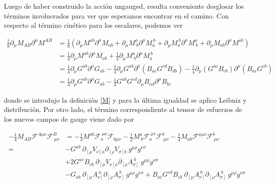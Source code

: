 \documentclass{article}
\numberwithin{equation}{section}
\begin{document}
Luego de haber construido la acción ungauged, resulta conveniente desglosar los términos involucrados para ver que esperamos encontrar en el camino. Con respecto al término cinético para los escalares, podemos ver


\begin{equation} \label{DMDM}
\begin{aligned}
\frac{1}{8}\partial_{\mu} M_{A B} \partial^{\mu} M^{A B} &= \frac{1}{8} \left( \partial_{\mu} M^{a b} \partial^{\mu} M_{a b}  + \partial_{\mu} M^a_{\ b} \partial^{\mu} M_a^{\ b} + \partial_{\mu} M_a^{\ b} \partial^{\mu} M^a_{\ b} + \partial_{\mu} M_{a b} \partial^{\mu} M^{a b} \right)\\
&= \frac{1}{4} \partial_{\mu} M^{a b} \partial^{\mu} M_{a b} + \frac{1}{4} \partial_{\mu} M^a_{\ b} \partial^{\mu} M_a^{\ b}\\
&= \frac{1}{4} \partial_{\mu} G^{a b}\partial^{\mu} G_{a b} - \frac{1}{4}\partial_{\mu} G^{a b} \partial^{\mu} \left(B_{a c} G^{c d} B_{d b} \right) - \frac{1}{4} \partial_{\mu} \left(G^{a c} B_{c b}\right) \partial^{\mu} \left( B_{a c} G^{c b}\right)\\
&= \frac{1}{4} \partial_{\mu} G^{a b}\partial^{\mu} G_{a b} - \frac{1}{4} G^{a b} G^{c d} \partial_{\mu} B_{a d} \partial^{\mu} B_{b c}
\end{aligned}
\end{equation}

donde se introdujo la definición \ref{M} y para la última igualdad se aplico Leibniz y distribución. Por otro lado, el término correspondiente al tensor de esfuerzos de los nuevos campos de gauge viene dado por

\begin{equation}\label{MFF}
\begin{aligned}
-\frac{1}{4} M_{A B} \mathcal{F}^{A \mu \nu} \mathcal{F}^B_{\ \mu \nu} &= -\frac{1}{4} M^{a b} \mathcal{F}_a^{\ \mu \nu} \mathcal{F}_{b \mu \nu} -\frac{1}{2} M^a_{\ b} \mathcal{F}_a^{\ \mu \nu} \mathcal{F}^b_{\ \mu \nu} -\frac{1}{4} M_{a b} \mathcal{F}^{a \mu \nu} \mathcal{F}^b_{\ \mu \nu}\\
=& - G^{a b} \ \partial_{\left[\mu\right.} V_{\left.\nu\right] a} \partial_{\left[\rho\right.} V_{\left.\sigma\right] b} \ g^{\mu \rho} g^{\nu \sigma}\\
&+ 2 G^{a c} B_{c b} \ \partial_{\left[\mu\right.} V_{\left.\nu\right] a} \partial_{\left[\rho\right.} A_{\left.\sigma\right]}^{\ b} \ g^{\mu \rho} g^{\nu \sigma}\\
&- G_{a b} \ \partial_{\left[\mu\right.} A_{\left.\nu\right]}^{\ a} \partial_{\left[\rho\right.} A_{\left.\sigma\right]}^{\ b} \ g^{\mu \rho} g^{\nu \sigma} + B_{a c} G^{c d} B_{c b} \ \partial_{\left[\mu\right.} A_{\left.\nu\right]}^{\ b} \partial_{\left[\rho\right.} A_{\left.\sigma\right]}^{\ b} \ g^{\mu \rho} g^{\nu \sigma}
\end{aligned}
\end{equation}
\end{document}
